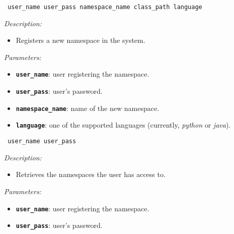 \begin{dBox}
\texttt{ \newline user\_name user\_pass namespace\_name class\_path language}
\LINE

{\it Description:}

\begin{itemize}
    \item Registers a new namespace in the system.
\end{itemize}

{\it Parameters:}

\begin{itemize}
    \item \texttt{\bfseries user\_name}: user registering the namespace.
    \item \texttt{\bfseries user\_pass}: user's password.
    \item \texttt{\bfseries namespace\_name}: name of the new namespace.
    \item \texttt{\bfseries language}: one of the supported languages (currently, \textit{python} or \textit{java}).
\end{itemize}
 
\end{dBox}


\begin{dBox}
\texttt{ \newline user\_name user\_pass}
\LINE

{\it Description:}

\begin{itemize}
    \item Retrieves the namespaces the user has access to.
\end{itemize}

{\it Parameters:}

\begin{itemize}
    \item \texttt{\bfseries user\_name}: user registering the namespace.
    \item \texttt{\bfseries user\_pass}: user's password.
\end{itemize}
 
\end{dBox}


